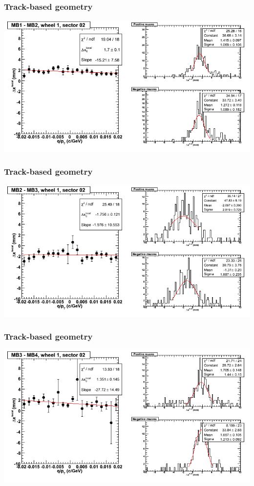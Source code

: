 \documentclass[compress]{beamer}
\begin{document}
\begin{frame}
\frametitle{Track-based geometry}
\includegraphics[width=\linewidth]{NOV4_segdiffs/dt13_resid_D_02_12.png}
\end{frame}

\begin{frame}
\frametitle{Track-based geometry}
\includegraphics[width=\linewidth]{NOV4_segdiffs/dt13_resid_D_02_23.png}
\end{frame}

\begin{frame}
\frametitle{Track-based geometry}
\includegraphics[width=\linewidth]{NOV4_segdiffs/dt13_resid_D_02_34.png}
\end{frame}
\end{document}

